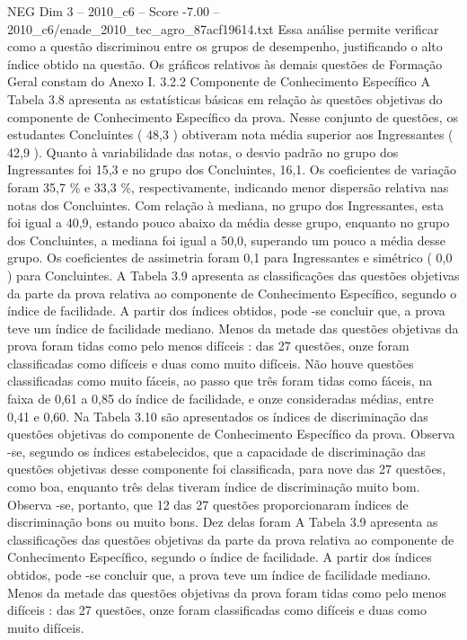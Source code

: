 \begin{textsample}{NEG Dim 3 – 2010\_c6 – Score -7.00 – 2010\_c6/enade\_2010\_tec\_agro\_87acf19614.txt}
Essa análise permite verificar como a questão discriminou entre os grupos de desempenho, justificando o alto índice obtido na questão.
Os gráficos relativos às demais questões de Formação Geral constam do Anexo I. 3.2.2 Componente de Conhecimento Específico A Tabela 3.8 apresenta as estatísticas básicas em relação às questões objetivas do componente de Conhecimento Específico da prova.
Nesse conjunto de questões, os estudantes Concluintes ( 48,3 ) obtiveram nota média superior aos Ingressantes ( 42,9 ).
Quanto à variabilidade das notas, o desvio padrão no grupo dos Ingressantes foi 15,3 e no grupo dos Concluintes, 16,1.
Os coeficientes de variação foram 35,7 \% e 33,3 \%, respectivamente, indicando menor dispersão relativa nas notas dos Concluintes.
Com relação à mediana, no grupo dos Ingressantes, esta foi igual a 40,9, estando pouco abaixo da média desse grupo, enquanto no grupo dos Concluintes, a mediana foi igual a 50,0, superando um pouco a média desse grupo.
Os coeficientes de assimetria foram 0,1 para Ingressantes e simétrico ( 0,0 ) para Concluintes.
A Tabela 3.9 apresenta as classificações das questões objetivas da parte da prova relativa ao componente de Conhecimento Específico, segundo o índice de facilidade.
A partir dos índices obtidos, pode -se concluir que, a prova teve um índice de facilidade mediano.
Menos da metade das questões objetivas da prova foram tidas como pelo menos difíceis : das 27 questões, onze foram classificadas como difíceis e duas como muito difíceis.
Não houve questões classificadas como muito fáceis, ao passo que três foram tidas como fáceis, na faixa de 0,61 a 0,85 do índice de facilidade, e onze consideradas médias, entre 0,41 e 0,60.
Na Tabela 3.10 são apresentados os índices de discriminação das questões objetivas do componente de Conhecimento Específico da prova.
Observa -se, segundo os índices estabelecidos, que a capacidade de discriminação das questões objetivas desse componente foi classificada, para nove das 27 questões, como boa, enquanto três delas tiveram índice de discriminação muito bom.
Observa -se, portanto, que 12 das 27 questões proporcionaram índices de discriminação bons ou muito bons.
Dez delas foram A Tabela 3.9 apresenta as classificações das questões objetivas da parte da prova relativa ao componente de Conhecimento Específico, segundo o índice de facilidade.
A partir dos índices obtidos, pode -se concluir que, a prova teve um índice de facilidade mediano.
Menos da metade das questões objetivas da prova foram tidas como pelo menos difíceis : das 27 questões, onze foram classificadas como difíceis e duas como muito difíceis.

\end{textsample}
